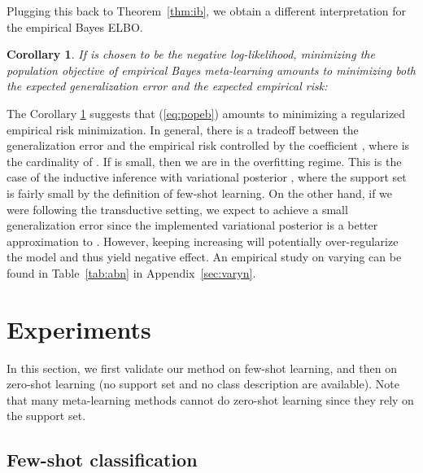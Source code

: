 \documentclass{article} \usepackage{iclr2020_conference,times}
\def\eqref#1{(\ref{#1})}
\newtheorem{coro}{Corollary}
\begin{document}
Plugging this back to Theorem~\ref{thm:ib}, we obtain a different interpretation for the empirical Bayes ELBO.

\begin{coro}
    \label{thm:gen}
    If  is chosen to be the negative log-likelihood, minimizing the population objective of empirical Bayes meta-learning
    amounts to minimizing both the expected generalization error and the expected empirical risk:
    
\end{coro}



The Corollary \ref{thm:gen} suggests that \eqref{eq:popeb} amounts to minimizing a regularized empirical risk minimization.
In general, there is a tradeoff between the generalization error and the empirical risk 
controlled by the coefficient , where  is the cardinality of .
If  is small, then we are in the overfitting regime. 
This is the case of the inductive inference with variational posterior , 
where the support set  is fairly small by the definition of few-shot learning.
On the other hand, if we were following the transductive setting, we expect to achieve a small generalization error since the implemented variational posterior is a better approximation to .
However, keeping increasing  will potentially over-regularize the model and thus yield negative effect.
An empirical study on varying  can be found in Table~\ref{tab:abn} in Appendix~\ref{sec:varyn}.


 \section{Experiments}
\label{sec:exp}
In this section, we first validate our method on few-shot learning, 
and then on zero-shot learning (no support set and no class description are available). 
Note that many meta-learning methods cannot do zero-shot learning since they rely on the support set.

\subsection{Few-shot classification}
\label{sec:few}
\end{document}
